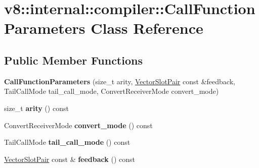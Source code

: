 \hypertarget{classv8_1_1internal_1_1compiler_1_1_call_function_parameters}{}\section{v8\+:\+:internal\+:\+:compiler\+:\+:Call\+Function\+Parameters Class Reference}
\label{classv8_1_1internal_1_1compiler_1_1_call_function_parameters}
\subsection*{Public Member Functions}
\begin{DoxyCompactItemize}
\item 
{\bfseries Call\+Function\+Parameters} (size\+\_\+t arity, \hyperlink{classv8_1_1internal_1_1compiler_1_1_vector_slot_pair}{Vector\+Slot\+Pair} const \&feedback, Tail\+Call\+Mode tail\+\_\+call\+\_\+mode, Convert\+Receiver\+Mode convert\+\_\+mode)\hypertarget{classv8_1_1internal_1_1compiler_1_1_call_function_parameters_aad6f46db228e176273e99e028e2336c3}{}\label{classv8_1_1internal_1_1compiler_1_1_call_function_parameters_aad6f46db228e176273e99e028e2336c3}

\item 
size\+\_\+t {\bfseries arity} () const \hypertarget{classv8_1_1internal_1_1compiler_1_1_call_function_parameters_ad0a874b2d27d6eb53669860d25526cc3}{}\label{classv8_1_1internal_1_1compiler_1_1_call_function_parameters_ad0a874b2d27d6eb53669860d25526cc3}

\item 
Convert\+Receiver\+Mode {\bfseries convert\+\_\+mode} () const \hypertarget{classv8_1_1internal_1_1compiler_1_1_call_function_parameters_af95b3e6060d9c2171526768173dc89ec}{}\label{classv8_1_1internal_1_1compiler_1_1_call_function_parameters_af95b3e6060d9c2171526768173dc89ec}

\item 
Tail\+Call\+Mode {\bfseries tail\+\_\+call\+\_\+mode} () const \hypertarget{classv8_1_1internal_1_1compiler_1_1_call_function_parameters_a0d3352483b609cf10bd46dd0bda7c294}{}\label{classv8_1_1internal_1_1compiler_1_1_call_function_parameters_a0d3352483b609cf10bd46dd0bda7c294}

\item 
\hyperlink{classv8_1_1internal_1_1compiler_1_1_vector_slot_pair}{Vector\+Slot\+Pair} const \& {\bfseries feedback} () const \hypertarget{classv8_1_1internal_1_1compiler_1_1_call_function_parameters_a74b9c4c66292266b94462b32688c66be}{}\label{classv8_1_1internal_1_1compiler_1_1_call_function_parameters_a74b9c4c66292266b94462b32688c66be}


\end{DoxyCompactItemize}
